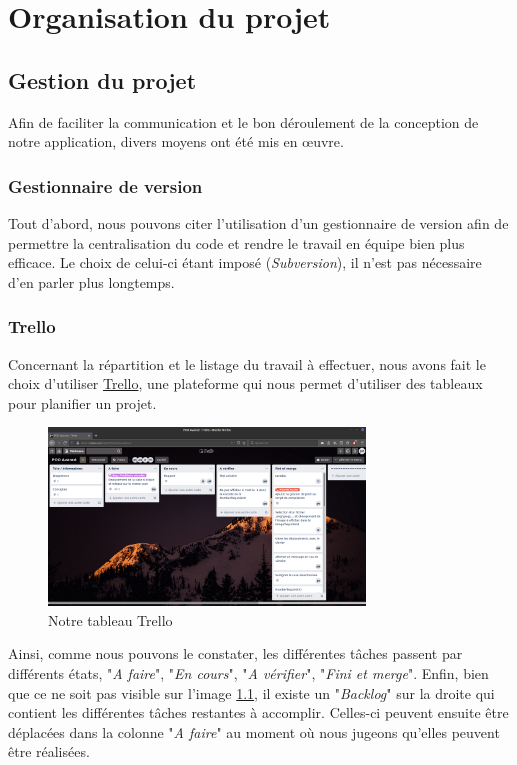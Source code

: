 \chapter{Organisation du projet}

	\section{Gestion du projet}

		Afin de faciliter la communication et le bon déroulement de la conception de notre application, divers moyens ont été mis en œuvre.

		\subsection{Gestionnaire de version}

			Tout d'abord, nous pouvons citer l'utilisation d'un gestionnaire de version afin de permettre la centralisation du code et rendre le travail en équipe bien plus efficace. Le choix de celui-ci étant imposé (\textit{Subversion}), il n'est pas nécessaire d'en parler plus longtemps.

		\subsection{Trello}

			Concernant la répartition et le listage du travail à effectuer, nous avons fait le choix d'utiliser \href{https://trello.com}{Trello}, une plateforme qui nous permet d'utiliser des tableaux pour planifier un projet.

			\begin{figure}[H]
				\centering\includegraphics[width=0.75\textwidth, keepaspectratio]{img/trello.png}
				\caption{Notre tableau Trello}
				\label{fig:trello}
			\end{figure}

			Ainsi, comme nous pouvons le constater, les différentes tâches passent par différents états, "\textit{A faire}", "\textit{En cours}", "\textit{A vérifier}", "\textit{Fini et merge}". Enfin, bien que ce ne soit pas visible sur l'image \ref{fig:trello}, il existe un "\textit{Backlog}" sur la droite qui contient les différentes tâches restantes à accomplir. Celles-ci peuvent ensuite être déplacées dans la colonne "\textit{A faire}" au moment où nous jugeons qu'elles peuvent être réalisées.

